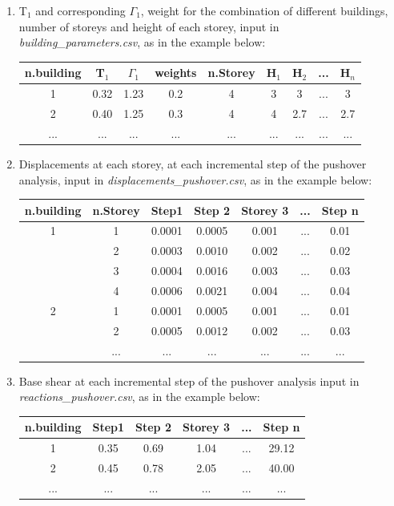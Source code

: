 \begin{enumerate}
\item T$_1$ and corresponding $\Gamma_1$, weight for the combination of different buildings, number of storeys and height of each storey, input in \textit{building\_parameters.csv}, as in the example below:
	\begin{table}[!htbp]
	\centering
	\begin{tabular}{|c|c|c|c|c|c|c|c|c|} \hline
	\textbf{n.building} & \textbf{T$_1$} & \textbf{$\Gamma_1$} & \textbf{weights} & \textbf{n.Storey} & \textbf{H$_1$} & \textbf{H$_2$} & ... & \textbf{H$_n$} \\ \hline
	1 & 0.32 & 1.23 & 0.2 & 4 & 3 & 3 & ... & 3 \\ \hline
	2 & 0.40 & 1.25 & 0.3 & 4 & 4 & 2.7 & ... & 2.7 \\ \hline
	... & ... & ... & ... & ... & ... & ... & ... & ... \\ \hline
	\end{tabular}
	\end{table}
	
\item Displacements at each storey, at each incremental step of the pushover analysis, input in \textit{displacements\_pushover.csv}, as in the example below: 
	\begin{table}[!htbp]
	\centering
	\begin{tabular}{|c|c|c|c|c|c|c|} \hline
	\textbf{n.building} & \textbf{n.Storey} & \textbf{Step1} & \textbf{Step 2} & \textbf{Storey 3} & ... & \textbf{Step n}\\ \hline
	1 &	1 & 0.0001 &	0.0005 &	0.001 & ... & 0.01\\ \hline
	   &	2 & 0.0003 &	0.0010 &	0.002 & ... & 0.02\\ \hline
	   &	3 & 0.0004 &	0.0016 &	0.003 & ... & 0.03\\ \hline
	   &	4 & 0.0006 &	0.0021 &	0.004 & ... & 0.04\\ \hline
	2 &	1 & 0.0001 &	0.0005 &	0.001 & ... & 0.01\\ \hline
	   &	2 & 0.0005 &	0.0012 &	0.002 & ... & 0.03\\ \hline
	   &	... & ... &	... &	... & ... & ...\\ \hline
	\end{tabular}
	\end{table}
	
\item Base shear at each incremental step of the pushover analysis input in \textit{reactions\_pushover.csv}, as in the example below:
	\begin{table}[!htbp]
	\centering
	\begin{tabular}{|c|c|c|c|c|c|} \hline
	\textbf{n.building} &	\textbf{Step1} & \textbf{Step 2} & \textbf{Storey 3} & ... & \textbf{Step n} \\ \hline
	1 & 0.35 & 0.69 & 1.04 & ... & 29.12\\ \hline
	2 & 0.45 & 0.78 & 2.05 & ... & 40.00\\ \hline
	... & ... & ... & ... & ... & ...\\ \hline
	\end{tabular}
	\end{table}
	

\end{enumerate}
